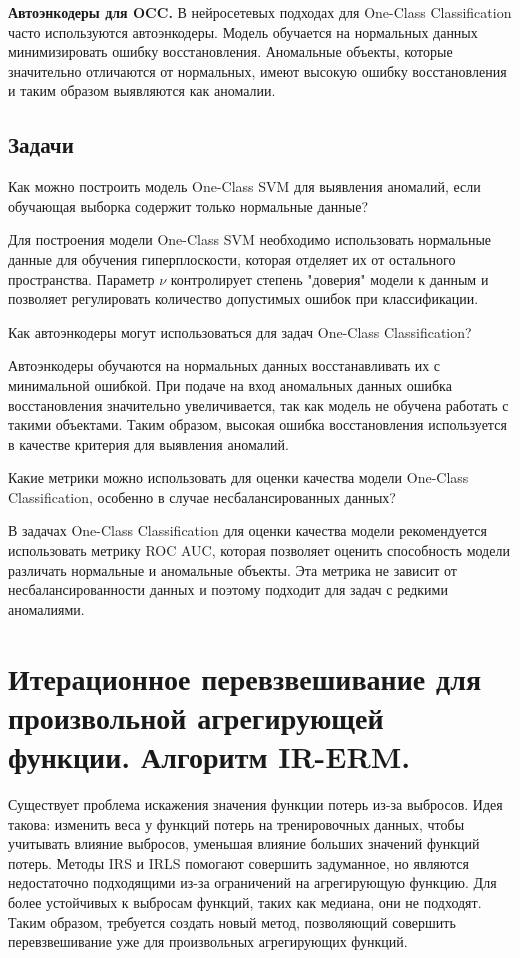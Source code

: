 \textbf{Автоэнкодеры для OCC.} В нейросетевых подходах для One-Class Classification часто используются автоэнкодеры. Модель обучается на нормальных данных минимизировать ошибку восстановления. Аномальные объекты, которые значительно отличаются от нормальных, имеют высокую ошибку восстановления и таким образом выявляются как аномалии.

\subsection{Задачи}

\problem Как можно построить модель One-Class SVM для выявления аномалий, если обучающая выборка содержит только нормальные данные?

\solution Для построения модели One-Class SVM необходимо использовать нормальные данные для обучения гиперплоскости, которая отделяет их от остального пространства. Параметр \( \nu \) контролирует степень "доверия" модели к данным и позволяет регулировать количество допустимых ошибок при классификации.

\problem Как автоэнкодеры могут использоваться для задач One-Class Classification?

\solution Автоэнкодеры обучаются на нормальных данных восстанавливать их с минимальной ошибкой. При подаче на вход аномальных данных ошибка восстановления значительно увеличивается, так как модель не обучена работать с такими объектами. Таким образом, высокая ошибка восстановления используется в качестве критерия для выявления аномалий.

\problem Какие метрики можно использовать для оценки качества модели One-Class Classification, особенно в случае несбалансированных данных?

\solution В задачах One-Class Classification для оценки качества модели рекомендуется использовать метрику ROC AUC, которая позволяет оценить способность модели различать нормальные и аномальные объекты. Эта метрика не зависит от несбалансированности данных и поэтому подходит для задач с редкими аномалиями.




\section{Итерационное перевзвешивание для произвольной агрегирующей функции. Алгоритм IR-ERM.}

Существует проблема искажения значения функции потерь из-за выбросов. Идея такова: изменить веса у функций потерь на тренировочных данных, чтобы учитывать влияние выбросов, уменьшая влияние больших значений функций потерь. Методы IRS и IRLS помогают совершить задуманное, но являются недостаточно подходящими из-за ограничений на агрегирующую функцию. Для более устойчивых к выбросам функций, таких как медиана, они не подходят. Таким образом, требуется создать новый метод, позволяющий совершить перевзвешивание уже для произвольных агрегирующих функций.

